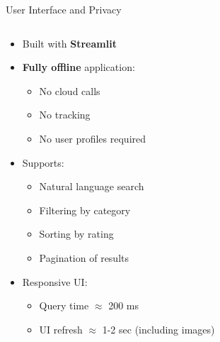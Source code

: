 \begin{frame}{User Interface and Privacy}

\begin{columns}[T]
  \begin{column}{0.40\textwidth}
    \begin{itemize}
        \item Built with \textbf{Streamlit}
        \item \textbf{Fully offline} application:
          \begin{itemize}
            \item No cloud calls
            \item No tracking
            \item No user profiles required
          \end{itemize}
        \item Supports:
          \begin{itemize}
            \item Natural language search
            \item Filtering by category
            \item Sorting by rating
            \item Pagination of results
          \end{itemize}
        \item Responsive UI:
          \begin{itemize}
            \item Query time $\approx$ 200 ms
            \item UI refresh $\approx$ 1-2 sec (including images)
          \end{itemize}
    \end{itemize}
  \end{column}


\end{columns}
\end{frame}
